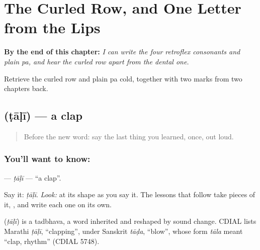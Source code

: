
\chapter{The Curled Row, and One Letter from the Lips}
\label{ch:retroflex-runway}

\begin{chapteropening}
\textbf{By the end of this chapter:} \emph{I can write the four retroflex consonants and plain pa, and hear the curled row apart from the dental one.}

Retrieve the curled row and plain pa cold, together with two marks from two chapters back.
\end{chapteropening}

\section[\texorpdfstring{\mr{टाळी} (ṭāḷī)}{टाळी (ṭāḷī)}]{ (ṭāḷī) — a clap}

\label{lesson:MR-C07-taali}



\begin{quote}
Before the new word: say the last thing you learned, once, out loud.
\end{quote}

\subsection*{You'll want to know: }
\textbf{} — \emph{ṭāḷī} — \textquotedblleft{}a clap\textquotedblright{}.

Say it: \emph{ṭāḷī}. \emph{Look:} at its shape as you say it. The lessons that follow take pieces of it, \textbf{}, and write each one on its own.

\begin{cousinweb}
\textbf{} (\emph{ṭāḷī}) is a tadbhava, a word inherited and reshaped by sound change. CDIAL lists Marathi \emph{ṭāḷī}, \textquotedblleft{}clapping\textquotedblright{}, under Sanskrit \emph{tāḍa}, \textquotedblleft{}blow\textquotedblright{}, whose form \emph{tāla} meant \textquotedblleft{}clap, rhythm\textquotedblright{} (CDIAL 5748).
\end{cousinweb}

